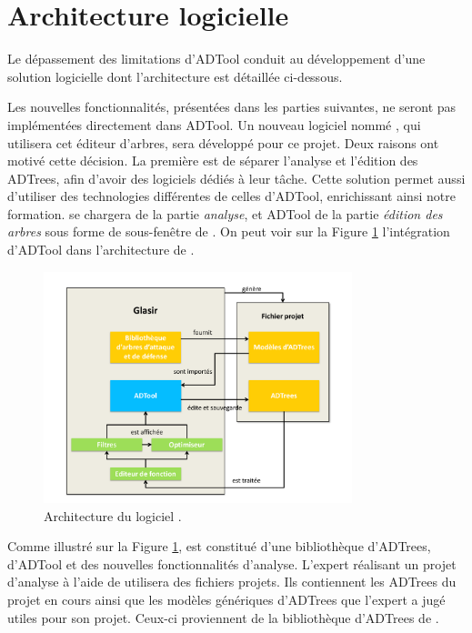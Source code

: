 \section{Architecture logicielle}
\label{Section : Archi}

Le dépassement des limitations d'ADTool conduit au développement d'une solution logicielle dont l'architecture est détaillée ci-dessous.

Les nouvelles fonctionnalités, présentées dans les parties suivantes, ne seront pas implémentées directement dans ADTool. Un nouveau logiciel nommé \glasir{}, qui utilisera cet éditeur d'arbres, sera développé pour ce projet. Deux raisons ont motivé cette décision. 
La première est de séparer l'analyse et l'édition des ADTrees, afin d'avoir des logiciels dédiés à leur tâche. Cette solution permet aussi d'utiliser des technologies différentes de celles d'ADTool, enrichissant ainsi notre formation. \glasir{} se chargera de la partie \textit{analyse}, et ADTool de la partie \textit{édition des arbres} sous forme de sous-fenêtre de \glasir{}. On peut voir sur la {\sc Figure} \ref{fig:architecture_Glasir} l'intégration d'ADTool dans l'architecture de \glasir{}.

	\begin{figure}[h!]
		\centering
			\includegraphics[width=0.8\textwidth]{figure/archiGlasir.pdf}
		\caption{Architecture du logiciel \glasir{}.}
		\label{fig:architecture_Glasir}
	\end{figure}

Comme illustré sur la {\sc Figure} \ref{fig:architecture_Glasir}, \glasir{} est constitué d'une bibliothèque d'ADTrees, d'ADTool et des nouvelles fonctionnalités d'analyse. L'expert réalisant un projet d'analyse à l'aide de \glasir{} utilisera des fichiers projets. Ils contiennent les ADTrees du projet en cours ainsi que les modèles génériques d'ADTrees que l'expert a jugé utiles pour son projet. Ceux-ci proviennent de la bibliothèque d'ADTrees de \glasir{}.
	
